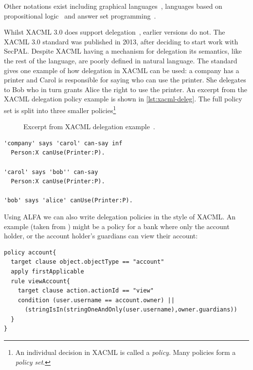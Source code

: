 \documentclass[thesis.tex]{subfiles}
\begin{document}
Other notations exist including graphical
languages~\cite{henrik_nergaard_scratch-based_2015}, languages based on
propositional logic~\cite{zhang_synthesising_2004} and answer set
programming~\cite{ramli_xacml_2012}.

Whilst XACML 3.0 does support delegation~\cite{oasis_xacml_2010}, earlier
versions do not. The XACML 3.0 standard was published in 2013, after deciding to
start work with SecPAL. Despite XACML having a mechanism for delegation its
semantics, like the rest of the language, are poorly defined in natural
language. The standard gives one example of how delegation in XACML can be used:
a company has a printer and Carol is responsible for saying who can use the
printer. She delegates to Bob who in turn grants Alice the right to use the
printer. An excerpt from the XACML delegation policy example is shown in
\autoref{lst:xacml-deleg}. The full policy set is split into three smaller
policies\footnote{An individual decision in XACML is called a \emph{policy}. Many policies form a \emph{policy set}.}

\begin{figure}
  \begin{minipage}{1\textwidth}
      
  \end{minipage}
  \caption[Excerpt from XACML delegation example.]{Excerpt from XACML delegation example~\cite{oasis_xacml_2010}.}
  \label{lst:xacml-deleg}
\end{figure}

\begin{lstlisting}
'company' says 'carol' can-say inf
  Person:X canUse(Printer:P).

'carol' says 'bob'' can-say
  Person:X canUse(Printer:P).

'bob' says 'alice' canUse(Printer:P).
\end{lstlisting}

Using ALFA we can also write delegation policies in the style of
XACML.  An example (taken from \cite{axiomatics_going_2016}) might be
a policy for a bank where only the account holder, or the account
holder's guardians can view their account:

\begin{lstlisting}
policy account{ 
  target clause object.objectType == "account"
  apply firstApplicable
  rule viewAccount{ 
    target clause action.actionId == "view"
    condition (user.username == account.owner) ||
      (stringIsIn(stringOneAndOnly(user.username),owner.guardians))
  }
}
\end{lstlisting}
\end{document}
